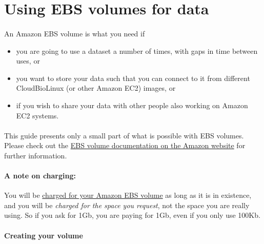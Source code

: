 \section{Using EBS volumes for data}
\label{section:ebscopy}
\paragraph{}An Amazon EBS volume is what you need if 
\begin{itemize}
\item you are going to use a dataset a number of times, with gaps in time between uses, or
\item you want to store your data such that you can connect to it from different CloudBioLinux (or other Amazon EC2) images, or
\item if you wish to share your data with other people also working on Amazon EC2 systems.
\end{itemize}

\paragraph{}This guide presents only a small part of what is possible with EBS volumes. Please check out the \href{http://docs.amazonwebservices.com/AWSEC2/latest/UserGuide/ebs-api-overview.html}{EBS volume documentation on the Amazon website} for further information.

\paragraph{A note on charging:}You will be \href{http://aws.amazon.com/ec2/}{charged for your Amazon EBS volume} as long as it is in existence, and you will be \emph{charged for the space you request}, not the space you are really using. So if you ask for 1Gb, you are paying for 1Gb, even if you only use 100Kb. 

\paragraph{Creating your volume}

